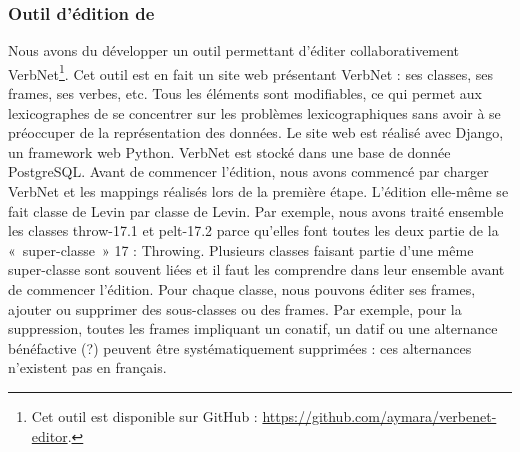 \subsubsection{Outil d'édition de \verbenet{}}\label{toolquentin}

Nous avons du développer un outil permettant d'éditer collaborativement
VerbNet\footnote{Cet outil est disponible sur GitHub :
\url{https://github.com/aymara/verbenet-editor}.}. Cet outil est en fait un
site web présentant VerbNet : ses classes, ses frames, ses verbes, etc.  Tous
les éléments sont modifiables, ce qui permet aux lexicographes de se concentrer
sur les problèmes lexicographiques sans avoir à se préoccuper de la
représentation des données. Le site web est réalisé avec Django, un framework
web Python. VerbNet est stocké dans une base de donnée PostgreSQL. Avant de
commencer l'édition, nous avons commencé par charger VerbNet et les mappings
réalisés lors de la première étape. L'édition elle-même se fait classe de Levin
par classe de Levin. Par exemple, nous avons traité ensemble les classes
{\color{blue}throw-17.1} et {\color{blue}pelt-17.2} parce qu'elles font toutes
les deux partie de la «~super-classe~» 17 : Throwing. Plusieurs classes faisant
partie d'une même super-classe sont souvent liées et il faut les comprendre
dans leur ensemble avant de commencer l'édition. Pour chaque classe, nous
pouvons éditer ses frames, ajouter ou supprimer des sous-classes ou des frames.
Par exemple, pour la suppression, toutes les frames impliquant un conatif, un
datif ou une alternance bénéfactive (?) peuvent être systématiquement
supprimées : ces alternances n'existent pas en français.


